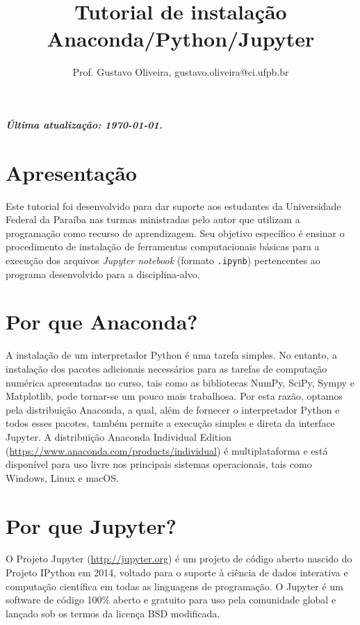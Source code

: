\documentclass[a4paper,12pt]{article}
\title{Tutorial de instalação Anaconda/Python/Jupyter}
\author{Prof. Gustavo Oliveira, gustavo.oliveira@ci.ufpb.br}
\affil{Departamento de Computação Científica, CI/UFPB}
\date{}
\begin{document}
\maketitle



\subparagraph{\scriptsize{Última atualização: \today.}}

\section{Apresentação}

Este tutorial foi desenvolvido para dar suporte aos estudantes da Universidade Federal da Paraíba nas turmas ministradas pelo
autor que utilizam a programação como recurso de aprendizagem. Seu objetivo específico é ensinar o procedimento de instalação de
ferramentas computacionais básicas para a execução dos arquivos
\emph{Jupyter notebook} (formato \texttt{.ipynb}) pertencentes ao
programa desenvolvido para a disciplina-alvo.

\section*{Por que Anaconda?}

A instalação de um interpretador Python é uma tarefa simples. No
entanto, a instalação dos pacotes adicionais necessários para as tarefas
de computação numérica apresentadas no curso, tais como as bibliotecas
NumPy, SciPy, Sympy e Matplotlib, pode tornar-se um pouco mais
trabalhosa. Por esta razão, optamos pela distribuição Anaconda, a qual,
além de fornecer o interpretador Python e todos esses pacotes, também
permite a execução simples e direta da interface Jupyter. A distribuição
Anaconda Individual Edition (\url{https://www.anaconda.com/products/individual}) é multiplataforma e está disponível para uso livre nos principais sistemas operacionais, tais como Windows, Linux e macOS.

\section*{Por que Jupyter?}

O Projeto Jupyter (\url{http://jupyter.org}) é um projeto de código aberto nascido do Projeto
IPython em 2014, voltado para o suporte à ciência de dados interativa e
computação científica em todas as linguagens de programação. O Jupyter é
um software de código 100\% aberto e gratuito para uso pela comunidade
global e lançado sob os termos da licença BSD modificada.
\end{document}
